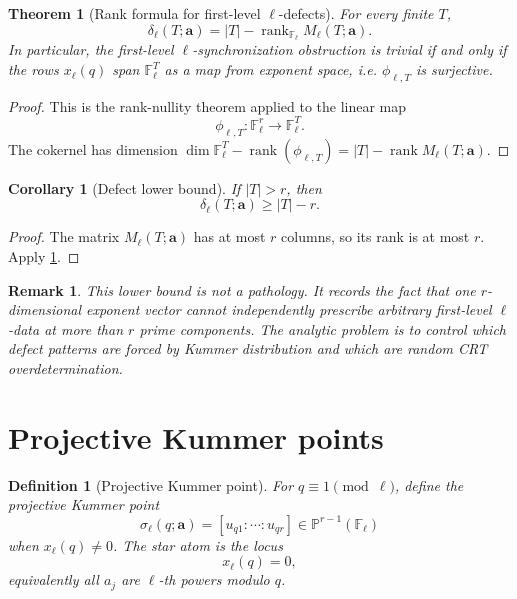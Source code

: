 \documentclass[11pt]{article}
\newtheorem{theorem}{Theorem}
\newtheorem{corollary}{Corollary}
\newtheorem{definition}{Definition}
\newtheorem{remark}{Remark}
\newcommand{\F}{\mathbb F}
\newcommand{\Pj}{\mathbb P}
\newcommand{\rank}{\operatorname{rank}}
\begin{document}
\begin{theorem}[Rank formula for first-level \(\ell\)-defects]\label{T:first-level-rank}
For every finite \(T\),
\[
\delta_\ell(T;\mathbf a)=|T|-\rank_{\F_\ell}M_\ell(T;\mathbf a).
\]
In particular, the first-level \(\ell\)-synchronization obstruction is trivial if and only if the rows \(x_\ell(q)\) span \(\F_\ell^T\) as a map from exponent space, i.e. \(\phi_{\ell,T}\) is surjective.
\end{theorem}

\begin{proof}
This is the rank-nullity theorem applied to the linear map
\[
\phi_{\ell,T}:\F_\ell^r\to\F_\ell^T.
\]
The cokernel has dimension \(\dim\F_\ell^T-\rank(\phi_{\ell,T})=|T|-\rank M_\ell(T;\mathbf a)\).
\end{proof}

\begin{corollary}[Defect lower bound]\label{C:defect-lower}
If \(|T|>r\), then
\[
\delta_\ell(T;\mathbf a)\ge |T|-r.
\]
\end{corollary}

\begin{proof}
The matrix \(M_\ell(T;\mathbf a)\) has at most \(r\) columns, so its rank is at most \(r\).  Apply \cref{T:first-level-rank}.
\end{proof}

\begin{remark}
This lower bound is not a pathology.  It records the fact that one \(r\)-dimensional exponent vector cannot independently prescribe arbitrary first-level \(\ell\)-data at more than \(r\) prime components.  The analytic problem is to control which defect patterns are forced by Kummer distribution and which are random CRT overdetermination.
\end{remark}

\section{Projective Kummer points}

\begin{definition}[Projective Kummer point]\label{D:projective-point}
For \(q\equiv1\pmod\ell\), define the projective Kummer point
\[
\sigma_\ell(q;\mathbf a)=[u_{q1}:\cdots:u_{qr}]\in\Pj^{r-1}(\F_\ell)
\]
when \(x_\ell(q)\ne0\).  The star atom is the locus
\[
x_\ell(q)=0,
\]
equivalently all \(a_j\) are \(\ell\)-th powers modulo \(q\).
\end{definition}
\end{document}
